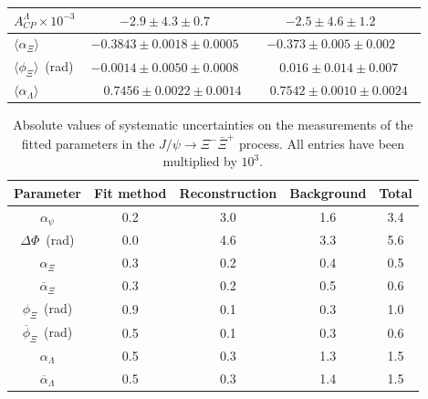 \documentclass[aps,amsmath,amssymb,reprint]{revtex4-2}
\newcommand{\XXb}{\Xi^{-}\bar{\Xi}^{+}}
\newcommand{\jpsi}{J/\psi}
\begin{document}
\begin{table}[hbtp]
\begin{tabular*}{\textwidth}{@{\extracolsep{\fill}}lcc}
$A_{CP}^{\Lambda}\times10^{-3}$              & $-2.9\pm4.3\pm0.7$ & $-2.5\pm4.6\pm1.2$~\cite{BESIII:2022qax} \\
\hline
$\langle\alpha_\Xi\rangle$         & $-0.3843\pm0.0018\pm0.0005$ & $-0.373\pm0.005\pm0.002$~\cite{BESIII:2021ypr} \\
$\langle\phi_\Xi\rangle$~(rad)     & $-0.0014\pm0.0050\pm0.0008$ & $\phantom{-}0.016\pm0.014\pm0.007$~\cite{BESIII:2021ypr} \\
$\langle\alpha_\Lambda\rangle$     & $\phantom{-}0.7456\pm0.0022\pm0.0014$ & $\phantom{-}0.7542\pm0.0010\pm0.0024$~\cite{BESIII:2022qax} \\
\hline\hline
\end{tabular*}
\label{table:sumres}
\end{table}




 \begin{table}[htbp]
     \caption{Absolute values of systematic uncertainties on the measurements of the fitted parameters in the $\jpsi\to\XXb$ process. All entries have been multiplied by $10^3$.}
     \centering
     \label{tab:sys}
     \begin{tabular}{ccccc}
 	\hline \hline
    Parameter	         &Fit method & Reconstruction &	Background & Total \\ \hline
$\alpha_{\psi}$	             &	0.2	&    3.0	 &1.6	   &  3.4\\ \hline
$\Delta{\Phi}$~(rad)	             &	0.0	&    4.6	 &3.3	   &  5.6\\ \hline
$\alpha_{\Xi}$	             &	0.3	&    0.2	 &0.4	   &  0.5\\ \hline
$\overline\alpha_{\Xi}$	     &	0.3	&    0.2	 &0.5	   &  0.6\\ \hline
$\phi_{\Xi}$~(rad)	             &	0.9	&    0.1	 &0.3	   &  1.0\\ \hline
$\overline\phi_{\Xi}$~(rad)	     &	0.5	&    0.1	 &0.3	   &  0.6\\ \hline
$\alpha_{\Lambda}$	         &	0.5	&    0.3	 &1.3	   &  1.5\\ \hline
$\overline\alpha_{\Lambda}$	 &	0.5	&    0.3	 &1.4	   &  1.5\\
 	\hline \hline
    \end{tabular}
    \end{table}
\end{document}
